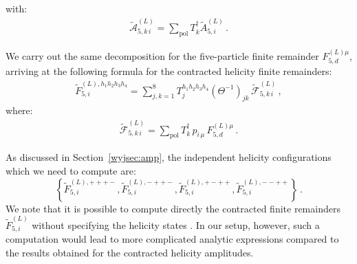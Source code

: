 \documentclass[main.tex]{subfiles}
\begin{document}
with:
\begin{align} \label{Wyjeq:Asumpol}
\tilde{\mathcal{A}}_{5,k \, i}^{(L)}  = \sum_{\text{pol}} {T}_{k}^\dagger \tilde{A}_{5,i}^{(L)} \,.
\end{align}

We carry out the same decomposition for the five-particle finite remainder $F_{5,d}^{(L)\mu}$, arriving at the following formula for the contracted helicity finite remainders:
\begin{align}
\label{Wyjeq:FA5Ldef}
\tilde{F}_{5,i}^{(L),h_1 h_2 h_3 h_4} = \sum_{j,k=1}^{8} T_{j}^{h_1 h_2 h_3 h_4} \left(\Theta^{-1}\right)_{jk}  \, \tilde{\mathcal{F}}_{5,k \, i}^{(L)}\,,
\end{align}
where:
\begin{align} \label{Wyjeq:FA5Ldefpt2}
\tilde{\mathcal{F}}_{5,k \, i}^{(L)}  = \sum_{\text{pol}} {T}_{k}^\dagger  \, p_{i \, \mu} \, F_{5,d}^{(L) \mu}  \,.
\end{align}

As discussed in Section~\ref{wyjsec:amp}, the independent helicity configurations which we need to compute are:
\begin{equation} \label{Wyjeq:indephel}
\left\{
\tilde{F}_{5,i}^{(L),+++-}, 
\tilde{F}_{5,i}^{(L),-++-}, 
\tilde{F}_{5,i}^{(L),+-++}, 
\tilde{F}_{5,i}^{(L),--++}
\right\} \,.
\end{equation}
We note that it is possible to compute directly the contracted finite remainders $\tilde{F}^{(L)}_{5,i}$ without specifying the helicity states . In our setup, however, such a computation would lead to more complicated analytic expressions compared to the results obtained for the contracted helicity amplitudes. 
\end{document}
